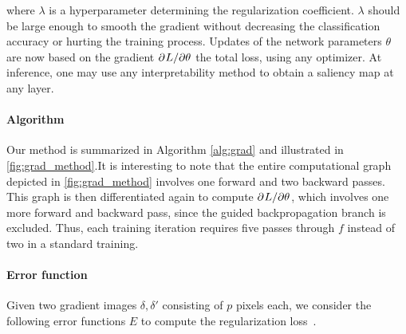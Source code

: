 
where $\lambda$ is a hyperparameter determining the regularization coefficient. 
$\lambda$ should be large enough to smooth the gradient without decreasing the classification 
accuracy or hurting the training process. 
Updates of the network parameters $\theta$ are now based on the gradient $\partial^{}{L}/\partial{\theta^{}}$ 
\wrt the total loss, using any optimizer. At inference, one may use any interpretability method 
to obtain a saliency map at any layer.

\paragraph{Algorithm}
Our method is summarized in Algorithm \ref{alg:grad} %
and illustrated in \ref{fig:grad_method}.It is interesting to note that the entire computational 
graph depicted in \ref{fig:grad_method} involves one forward and two backward passes. This graph is 
then differentiated again to compute $\partial^{}{L}/\partial{\theta^{}}$, which involves one more forward and 
backward pass, since the guided backpropagation branch is excluded. Thus, each training iteration 
requires five passes through $f$ instead of two in a standard training.



\paragraph{Error function}

Given two gradient images $\delta, \delta'$ consisting of $p$ pixels each, we consider the 
following error functions $E$ to compute the regularization loss~.




